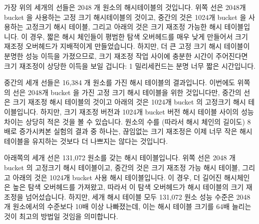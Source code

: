 가장 위의 세개의 선들은 2048 개 원소의 해시테이블의 것입니다.
위쪽 선은 2048개 bucket 을 사용하는 고정 크기 해시테이블의 것이고, 중간의 것은
1024개 bucket 을 사용하는 고정크기 해시 테이블, 그리고 아래의 것은 크기 재조정
가능한 해시 테이블입니다.
이 경우, 짧은 해시 체인들이 평범한 탐색 오버헤드를 매우 낮게 만들어서 크기
재조정 오버헤드가 지배적이게 만들었습니다.
하지만, 더 큰 고정 크기 해시 테이블이 분명한 성능 이득을 가졌으므로, 크기
재조정 작업 사이에 충분한 시간이 주어진다면 크기 재조정이 상당한 이득을 보일
겁니다: 1 밀리세컨드는 분명 너무 짧은 시간입니다.

중간의 세개 선들은 16,384 개 원소를 가진 해시 테이블의 결과입니다.
이번에도 위쪽의 선은 2048개 bucket 을 가진 고정 크기 해시 테이블을 위한
것입니다만, 중간의 선은 크기 재조정 해시 테이블의 것이고 아래의 것은 1024개
bucket 의 고정크기 해시 테이블입니다.
하지만, 크기 재조정 버전과 1024개 bucket 버전 해시 테이블 사이의 성능 차이는
상당히 적은 것을 볼 수 있습니다.
원소의 수를 (따라서 해시 체인의 길이도) 8배로 증가시켜본 실험의 결과 중 하나는,
끊임없는 크기 재조정은 이제 너무 작은 해시 테이블을 유지하는 것보다 더 나쁘지는
않다는 것입니다.

아래쪽의 세개 선은 131,072 원소를 갖는 해시 테이블입니다.
위쪽 선은 2048 개 bucket 의 고정크기 해시 테이블이고, 중간의 것은 크기 재조정
가능 해시 테이블, 그리고 아래의 것은 1024개 bucket 사용 해시 테이블입니다.
이 경우, 더 길어진 해시체인은 높은 탐색 오버헤드를 가져왔고, 따라서 이 탐색
오버헤드가 해시 테이블의 크기 재조정을 넘어섰습니다.
하지만, 세개 해시 테이블 모두 131,072 원소 성능 수준은 2048개 원소에서의
수준보다 10배 이상 나빠졌는데, 이는 해시 테이블 크기를 64배 늘리는 것이 최고의
방법일 것임을 의미합니다.
\iffalse

